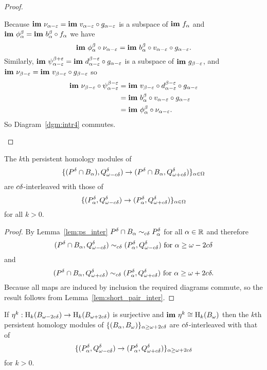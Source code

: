 \begin{proof}
\begin{enumerate}[label=\Roman*.]
    Because $\mathbf{im}~\nu_{\alpha-\varepsilon} = \mathbf{im}~v_{\alpha-\varepsilon}\circ g_{\alpha-\varepsilon}$ is a subspace of $\mathbf{im}~f_\alpha$ and $\mathbf{im}~\phi_\alpha^\beta = \mathbf{im}~b_\alpha^\beta\circ f_\alpha$ we have
    \[ \mathbf{im}~\phi_\alpha^\beta\circ \nu_{\alpha-\varepsilon} = \mathbf{im}~b_\alpha^\beta\circ v_{\alpha-\varepsilon}\circ g_{\alpha-\varepsilon}.\]
    Similarly, $\mathbf{im}~\psi_{\alpha-\varepsilon}^{\beta + \varepsilon} = \mathbf{im}~d_{\alpha-\varepsilon}^{\beta -\varepsilon}\circ g_{\alpha-\varepsilon}$ is a subspace of $\mathbf{im}~g_{\beta-\varepsilon}$, and $\mathbf{im}~\nu_{\beta -\varepsilon} = \mathbf{im}~v_{\beta -\varepsilon}\circ g_{\beta-\varepsilon}$ so
    \begin{align*}
      \mathbf{im}~\nu_{\beta -\varepsilon}\circ\psi_{\alpha-\varepsilon}^{\beta -\varepsilon} &= \mathbf{im}~v_{\beta -\varepsilon}\circ d_{\alpha-\varepsilon}^{\beta-\varepsilon}\circ g_{\alpha-\varepsilon}\\
        &=\mathbf{im}~ b_\alpha^\beta\circ v_{\alpha-\varepsilon}\circ g_{\alpha-\varepsilon}\\
        &= \mathbf{im}~\phi_\alpha^\beta\circ\nu_{\alpha-\varepsilon}.
    \end{align*}
    So Diagram~\ref{dgm:intr4} commutes.
  \end{enumerate}
\end{proof}

\begin{lemma}
  The $k$th persistent homology modules of
  \[ \{(P^{{\delta}}\cap B_\alpha), Q_{\omega - c{\delta}}^\delta)\to (P^{{\delta}}\cap B_\alpha, Q_{\omega + c{\delta}}^\delta)\}_{\alpha\in\Omega} \]
  are $c{\delta}$-interleaved with those of
  \[ \{(P^{{\delta}}_\alpha, Q_{\omega - c{\delta}}^\delta)\to (P^{{\delta}}_\alpha,Q_{\omega + c{\delta}}^\delta)\}_{\alpha\in\Omega} \]
  for all $k > 0$.
\end{lemma}
\begin{proof}
  By Lemma~\ref{lem:ps_inter} $P^{{\delta}}\cap B_\alpha\sim_{c{\delta}} P^{{\delta}}_\alpha$ for all $\alpha\in\mathbb{R}$ and therefore
  \[ (P^{{\delta}}\cap B_\alpha, Q_{\omega - c{\delta}}^\delta)\sim_{c{\delta}} (P^{{\delta}}_\alpha, Q_{\omega - c{\delta}}^\delta)\text{ for } \alpha \geq \omega - 2c{\delta}\]
  and
  \[ (P^{{\delta}}\cap B_\alpha, Q_{\omega + c{\delta}}^\delta)\sim_{c{\delta}} (P^{{\delta}}_\alpha, Q_{\omega + c{\delta}}^\delta)\text{ for }\alpha \geq \omega + 2c\delta.\]
  Because all maps are induced by inclusion the required diagrams commute, so the result follows from Lemma~\ref{lem:short_pair_inter}.
\end{proof}

\begin{corollary}
  If $\eta^k : \mathrm{H}_k(B_{\omega - 2c{\delta}})\to \mathrm{H}_k(B_{\omega + 2c{\delta}})$ is surjective and $\mathbf{im}~\eta^k\cong \mathrm{H}_k(B_\omega)$ then the $k$th persistent homology modules of
  $\{(B_\alpha, B_\omega)\}_{\alpha\geq\omega + 2c{\delta}}$ are $c{\delta}$-interleaved with that of
  \[\{(P_\alpha^{\delta}, Q_{\omega - c{\delta}}^{\delta})\to (P_\alpha^{\delta}, Q_{\omega + c{\delta}}^{\delta})\}_{\alpha\geq\omega + 2c{\delta}}\]
  for $k > 0$.
\end{corollary}
